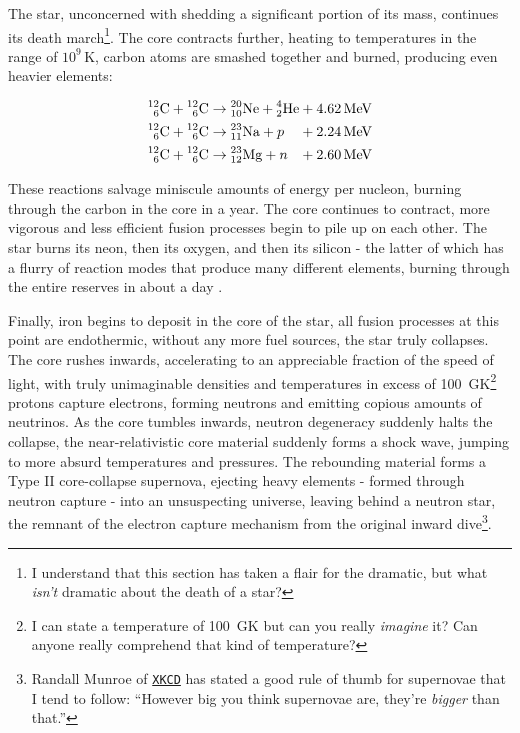 The star, unconcerned with shedding a significant portion of its mass, continues its death march\footnote{I understand that this section has taken a flair for the dramatic, but what \emph{isn't} dramatic about the death of a star?}.
The core contracts further, heating to temperatures in the range of $10^9 \, \si{\kelvin}$, carbon atoms are smashed together and burned, producing even heavier elements:

\begin{equation}
  \begin{alignedat}{3}
    \atom{C}{12}{6} + \atom{C}{12}{6} & \rightarrow \atom{Ne}{20}{10} + \atom{He}{4}{2} && + \SI{4.62}{\mega\electronvolt} \\
    \atom{C}{12}{6} + \atom{C}{12}{6} & \rightarrow \atom{Na}{23}{11} + p && + \SI{2.24}{\mega\electronvolt} \\
    \atom{C}{12}{6} + \atom{C}{12}{6} & \rightarrow \atom{Mg}{23}{12} + n && + \SI{2.60}{\mega\electronvolt}
  \end{alignedat}
\end{equation}

\noindent
These reactions salvage miniscule amounts of energy per nucleon, burning through the carbon in the core in a year.
The core continues to contract, more vigorous and less efficient fusion processes begin to pile up on each other.
The star burns its neon, then its oxygen, and then its silicon - the latter of which has a flurry of reaction modes that produce many different elements, burning through the entire reserves in about a day
\parencite[Ch.~6]{ryanStellarEvolutionNucleosynthesis2010a}.

Finally, iron begins to deposit in the core of the star, all fusion processes at this point are endothermic, without any more fuel sources, the star truly collapses.
The core rushes inwards, accelerating to an appreciable fraction of the speed of light, with truly unimaginable densities and temperatures in excess of \SI{100}{\giga\kelvin}\footnote{I can state a temperature of \SI{100}{\giga\kelvin} but can you really \emph{imagine} it? Can anyone really comprehend that kind of temperature?} protons capture electrons, forming neutrons and emitting copious amounts of neutrinos.
As the core tumbles inwards, neutron degeneracy suddenly halts the collapse, the near-relativistic core material suddenly forms a shock wave, jumping to more absurd temperatures and pressures.
The rebounding material forms a Type II core-collapse supernova, ejecting heavy elements - formed through neutron capture - into an unsuspecting universe, leaving behind a neutron star, the remnant of the electron capture mechanism from the original inward dive\footnote{Randall Munroe of \href{https://what-if.xkcd.com/73/}{\texttt{XKCD}} has stated a good rule of thumb for supernovae that I tend to follow: ``However big you think supernovae are, they're \emph{bigger} than that.''}.

